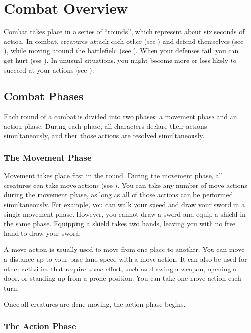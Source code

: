 \section{Combat Overview}\label{Combat Overview}

Combat takes place in a series of ``rounds'', which represent about six seconds of action. In combat, creatures attack each other (see ) and defend themselves (see ), while moving around the battlefield (see ). When your defenses fail, you can get hurt (see ). In unusual situations, you might become more or less likely to succeed at your actions (see ).

\subsection{Combat Phases}

Each round of a combat is divided into two phases: a movement phase and an action phase. During each phase, all characters declare their actions simultaneously, and then those actions are resolved simultaneously.

\subsubsection{The Movement Phase}\label{The Movement Phase}

Movement takes place first in the round. During the movement phase, all creatures can take move actions (see ). You can take any number of move actions during the movement phase, as long as all of those actions can be performed simultaneously. For example, you can walk your speed and draw your sword in a single movement phase. However, you cannot draw a sword and equip a shield in the same phase. Equipping a shield takes two hands, leaving you with no free hand to draw your sword.

 A move action is usually used to move from one place to another. You can move a distance up to your base land speed with a move action. It can also be used for other activities that require some effort, such as drawing a weapon, opening a door, or standing up from a prone position. You can take one move action each turn.

Once all creatures are done moving, the action phase begins.

\subsubsection{The Action Phase}\label{The Action Phase}

